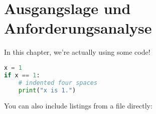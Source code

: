 \chapter{Ausgangslage und Anforderungsanalyse}\label{ch:analyse}

In this chapter, we're actually using some code!

\begin{lstlisting}[language=Python,caption={This is an example of inline listing},captionpos=b]
x = 1
if x == 1:
    # indented four spaces
    print("x is 1.")

\end{lstlisting}

You can also include listings from a file directly:


